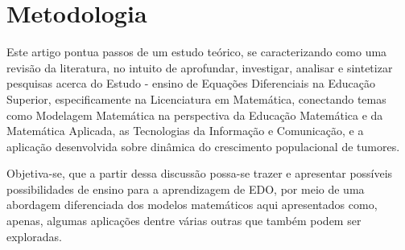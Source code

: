\section{Metodologia}

Este artigo pontua passos de um estudo teórico, se caracterizando como uma revisão da literatura, no intuito de aprofundar, investigar, analisar e sintetizar pesquisas
acerca do Estudo - ensino de Equações Diferenciais na Educação Superior, especificamente na Licenciatura em Matemática, conectando temas como Modelagem Matemática na 
perspectiva da Educação Matemática e da Matemática Aplicada, as Tecnologias da Informação e Comunicação, e a aplicação desenvolvida sobre dinâmica do crescimento 
populacional de tumores.

Objetiva-se, que a partir dessa discussão possa-se trazer e apresentar possíveis possibilidades de ensino para a aprendizagem de EDO, por meio de uma abordagem 
diferenciada dos modelos matemáticos aqui apresentados como, apenas, algumas aplicações dentre várias outras que também podem ser exploradas.
